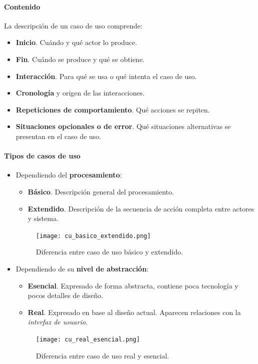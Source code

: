 \documentclass[12pt,spanish]{article}
\begin{document}
\paragraph{Contenido}

La descripción de un caso de uso comprende:
\begin{itemize}
	\item \textbf{Inicio}. Cuándo y qué actor lo produce.
	\item \textbf{Fin}. Cuándo se produce y qué se obtiene.
	\item \textbf{Interacción}. Para qué se usa o qué intenta el caso de uso.
	\item \textbf{Cronología} y origen de las interacciones.
	\item \textbf{Repeticiones de comportamiento}. Qué acciones se repiten.
	\item \textbf{Situaciones opcionales o de error}. Qué situaciones alternativas se presentan en el caso de uso.
\end{itemize}

\paragraph{Tipos de casos de uso}

\begin{itemize}
	\item Dependiendo del \textbf{procesamiento}:
		\begin{itemize}
			\item \textbf{Básico}. Descripción general del procesamiento.
			\item \textbf{Extendido}. Descripción de la secuencia de acción completa entre actores y sistema.
		\end{itemize}	
	\begin{figure}[H]
		\centering
		\texttt{[image: cu\_basico\_extendido.png]}
		\caption{Diferencia entre caso de uso básico y extendido.}
	\end{figure}
	\item Dependiendo de su \textbf{nivel de abstracción}:
		\begin{itemize}
			\item \textbf{Esencial}. Expresado de forma abstracta, contiene poca tecnología y pocos detalles de diseño.
			\item \textbf{Real}. Expresado en base al diseño actual. Aparecen relaciones con la \emph{interfaz de usuario}.
		\end{itemize}
	\begin{figure}[H]
		\centering
		\texttt{[image: cu\_real\_esencial.png]}
		\caption{Diferencia entre caso de uso real y esencial.}
	\end{figure}
			
\end{itemize}
\end{document}
